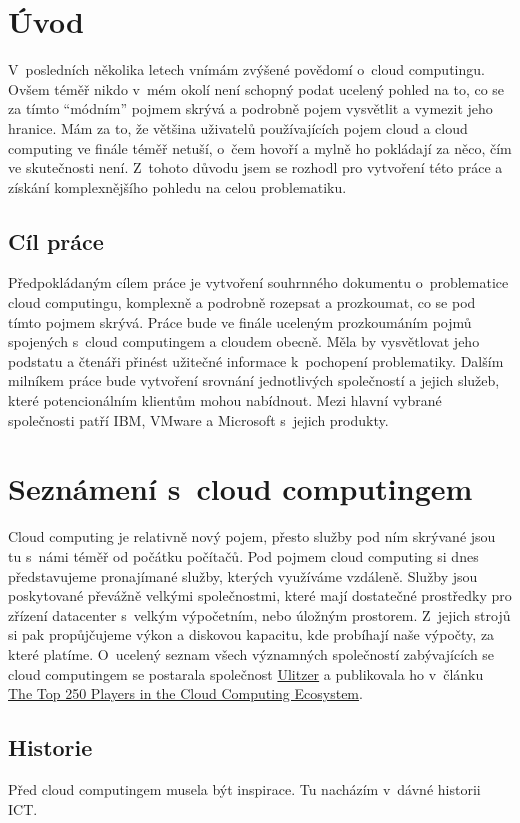 \section{Úvod}
V~posledních několika letech vnímám zvýšené povědomí o~cloud computingu. Ovšem téměř nikdo v~mém  okolí není schopný podat ucelený pohled na to, co se za tímto "`módním"' pojmem skrývá a podrobně pojem vysvětlit a vymezit jeho hranice. Mám za to, že většina uživatelů používajících pojem cloud a cloud computing ve finále téměř netuší, o~čem hovoří a mylně ho pokládají za něco, čím ve skutečnosti není. Z~tohoto důvodu jsem se rozhodl pro vytvoření této práce a získání komplexnějšího pohledu na celou problematiku.

\subsection{Cíl práce}
Předpokládaným cílem práce je vytvoření souhrnného dokumentu o~problematice cloud computingu, komplexně a podrobně rozepsat a prozkoumat, co se pod tímto pojmem skrývá. Práce bude ve finále uceleným prozkoumáním pojmů spojených s~cloud computingem a cloudem obecně. Měla by vysvětlovat jeho podstatu a čtenáři přinést užitečné informace k~pochopení problematiky. Dalším milníkem práce bude vytvoření srovnání jednotlivých společností a jejich služeb, které potencionálním klientům mohou nabídnout. Mezi hlavní vybrané společnosti patří IBM, VMware a Microsoft s~jejich produkty.

\newpage
\section{Seznámení s~cloud computingem}
Cloud computing je relativně nový pojem, přesto služby pod ním skrývané jsou tu s~námi téměř od počátku počítačů. Pod pojmem cloud computing si dnes představujeme pronajímané služby, kterých využíváme vzdáleně. Služby jsou poskytované převážně velkými společnostmi, které mají dostatečné prostředky pro zřízení datacenter s~velkým výpočetním, nebo úložným prostorem. Z~jejich strojů si pak propůjčujeme výkon a diskovou kapacitu, kde probíhají naše výpočty, za které platíme. O~ucelený seznam všech významných společností zabývajících se cloud computingem se postarala společnost \href{http://www.ulitzer.com}{Ulitzer} a publikovala ho v~článku \href{http://web2.sys-con.com/node/1386896}{The Top 250 Players in the Cloud Computing Ecosystem\cite{syscon:top250}}.

\subsection{Historie}
Před cloud computingem musela být inspirace. Tu nacházím v~dávné historii ICT.

